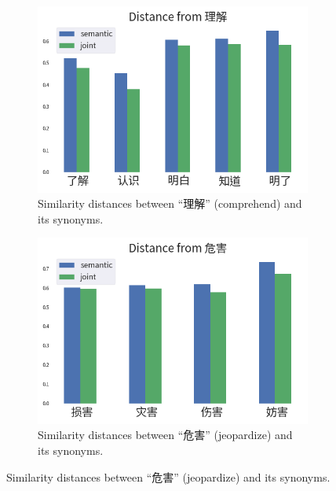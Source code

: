 \begin{figure}[h!]
    \begin{CJK}{UTF8}{gbsn}
    \centering
    \begin{subfigure}[b]{0.44\textwidth}
        \centering
        \includegraphics[width=\textwidth]{../images/similarity_zh1.png}
        \caption{Similarity distances between ``理解'' (comprehend) and its synonyms.}
        \label{fig:similarity_zh1}
    \end{subfigure}
    \hspace{2em}
    \begin{subfigure}[b]{0.44\textwidth}
        \centering
        \includegraphics[width=\textwidth]{../images/similarity_zh2.png}
        \caption{Similarity distances between ``危害'' (jeopardize) and its synonyms.}
        \label{fig:similarity_zh2}
    \end{subfigure}

\end{CJK}
\end{figure}
